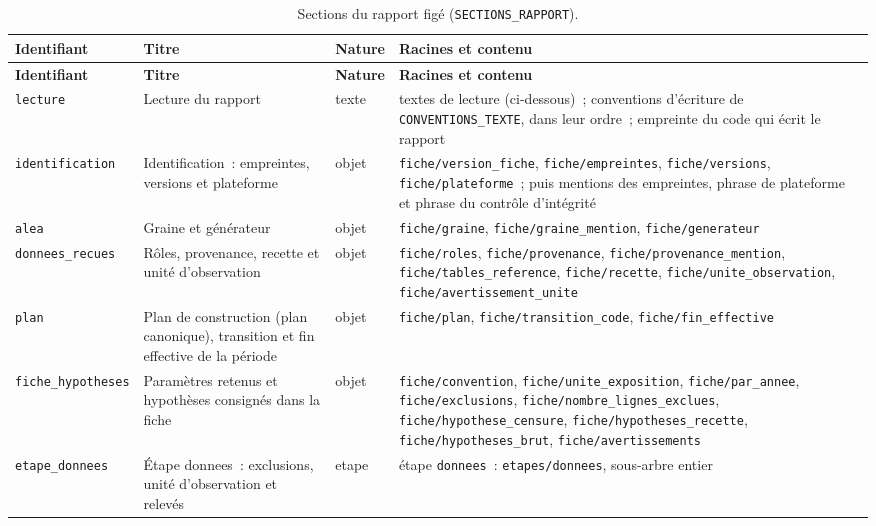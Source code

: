\documentclass[a4paper,11pt]{article}
\newcommand{\code}[1]{\texttt{\small #1}}
\begin{document}
{\footnotesize
{}
\begin{longtable}{@{}p{3.1cm}p{4.2cm}p{2.0cm}p{5.3cm}@{}}
\caption{Sections du rapport figé (\code{SECTIONS\_RAPPORT}).}
\label{tab:sections-rapport}\\
\rowcolor{tableheader}
\textcolor{financeblue}{\textbf{Identifiant}} &
\textcolor{financeblue}{\textbf{Titre}} &
\textcolor{financeblue}{\textbf{Nature}} &
\textcolor{financeblue}{\textbf{Racines et contenu}} \\
\endfirsthead
\rowcolor{tableheader}
\textcolor{financeblue}{\textbf{Identifiant}} &
\textcolor{financeblue}{\textbf{Titre}} &
\textcolor{financeblue}{\textbf{Nature}} &
\textcolor{financeblue}{\textbf{Racines et contenu}} \\
\endhead
\code{lecture} & Lecture du rapport & texte & textes de lecture (ci-dessous)~; conventions d'écriture de \code{CONVENTIONS\_TEXTE}, dans leur ordre~; empreinte du code qui écrit le rapport \\
\code{identification} & Identification~: empreintes, versions et plateforme & objet & \code{fiche/version\_fiche}, \code{fiche/empreintes}, \code{fiche/versions}, \code{fiche/plateforme}~; puis mentions des empreintes, phrase de plateforme et phrase du contrôle d'intégrité \\
\code{alea} & Graine et générateur & objet & \code{fiche/graine}, \code{fiche/graine\_mention}, \code{fiche/generateur} \\
\code{donnees\_recues} & Rôles, provenance, recette et unité d'observation & objet & \code{fiche/roles}, \code{fiche/provenance}, \code{fiche/provenance\_mention}, \code{fiche/tables\_reference}, \code{fiche/recette}, \code{fiche/unite\_observation}, \code{fiche/avertissement\_unite} \\
\code{plan} & Plan de construction (plan canonique), transition et fin effective de la période & objet & \code{fiche/plan}, \code{fiche/transition\_code}, \code{fiche/fin\_effective} \\
\code{fiche\_hypotheses} & Paramètres retenus et hypothèses consignés dans la fiche & objet & \code{fiche/convention}, \code{fiche/unite\_exposition}, \code{fiche/par\_annee}, \code{fiche/exclusions}, \code{fiche/nombre\_lignes\_exclues}, \code{fiche/hypothese\_censure}, \code{fiche/hypotheses\_recette}, \code{fiche/hypotheses\_brut}, \code{fiche/avertissements} \\
\code{etape\_donnees} & Étape donnees~: exclusions, unité d'observation et relevés & etape & étape \code{donnees}~: \code{etapes/donnees}, sous-arbre entier \\

\end{longtable}}
\end{document}
